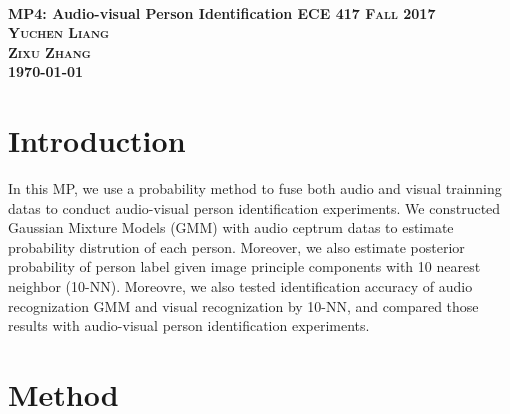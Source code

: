 \documentclass{article}
\begin{document}
	\everymath{\displaystyle}
	\begin{titlepage}	 	
		\center
		\text{}\\[3cm]
		\linespread{2}\huge \bfseries MP4: Audio-visual Person Identification
		\center\textsc{\Large ECE 417 Fall 2017}\\[1cm]
		\Large\center\textsc{Yuchen Liang\\ Zixu Zhang  }\\[1.4cm]
		\Large \today\\
		\vfill
	\end{titlepage}
	\setlength{\baselineskip}{24pt}
	
	\section{Introduction}
	In this MP, we use a probability method to fuse both audio and visual trainning datas to conduct audio-visual person identification experiments. We constructed Gaussian Mixture Models (GMM) with audio ceptrum datas to estimate probability distrution of each person. Moreover, we also estimate posterior probability of person label given image principle components with 10 nearest neighbor (10-NN). Moreovre, we also tested identification accuracy of audio recognization GMM and visual recognization by 10-NN, and compared those results with audio-visual person identification experiments.\\
	
	\section{Method}
\end{document}
